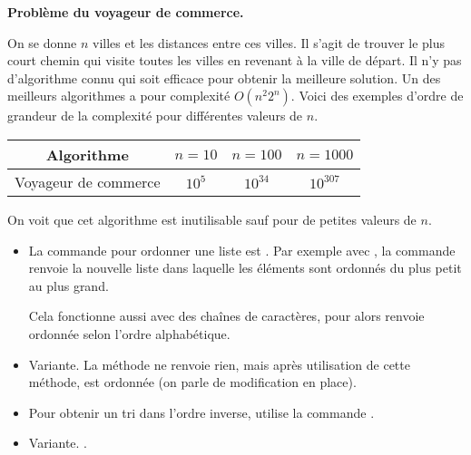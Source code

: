\documentclass[11pt,class=report,crop=false]{standalone}
\begin{document}
\begin{cours}
\bigskip

\textbf{Problème du voyageur de commerce.}

On se donne $n$ villes et les distances entre ces villes. Il s'agit de trouver le plus court chemin qui visite toutes les villes en revenant à la ville de départ. Il n'y pas d'algorithme connu qui soit efficace pour obtenir la meilleure solution. Un des meilleurs algorithmes a pour complexité $O(n^2  2^n)$.
Voici des exemples d'ordre de grandeur de la complexité pour différentes valeurs de $n$.
\begin{center}
	\begin{tabular}{|c|c|c|c|}\hline
		Algorithme  & $n=10$ & $n=100$ & $n=1000$  \\ \hline\hline
		Voyageur de commerce & $10^5$ & $10^{34}$ & $10^{307}$ \\ \hline

	\end{tabular}
\end{center} 

On voit que cet algorithme est inutilisable sauf pour de petites valeurs de $n$.

 	
\end{cours}



\begin{cours}
\sauteligne
\begin{itemize}
	
	\item  La commande \Python{} pour ordonner une liste est .
	Par exemple avec , la commande  renvoie la nouvelle liste \ci{[1, 5, 6, 8, 10]} dans laquelle les éléments sont ordonnés du plus petit au plus grand.
	
	Cela fonctionne aussi avec des chaînes de caractères, pour	
	 alors  renvoie  ordonnée selon l'ordre alphabétique.
	
	\item Variante. La méthode  ne renvoie rien, mais après utilisation de cette méthode,  est ordonnée (on parle de modification en place).
	
	\item Pour obtenir un tri dans l'ordre inverse, utilise la commande .
	
	\item  Variante. .
\end{itemize}
\end{cours}
\end{document}
